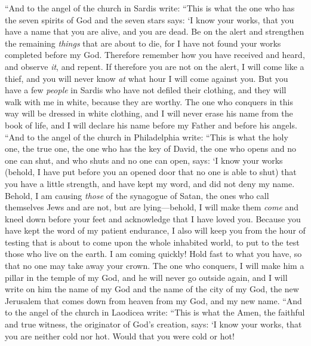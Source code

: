 \begin{biblechapter} %
 “And to the angel of the church in Sardis write:
\verse “This is what the one who has the seven spirits of God and the seven stars says: ‘I know your works, that you have a name that you are alive, and you are dead.
\verse Be on the alert and strengthen the remaining \textit{things} that are about to die, for I have not found your works completed before my God.
\verse Therefore remember how you have received and heard, and observe \textit{it}, and repent. If therefore you are not on the alert, I will come like a thief, and you will never know \textit{at} what hour I will come against you.
\verse But you have a few \textit{people} in Sardis who have not defiled their clothing, and they will walk with me in white, because they are worthy.
\verse The one who conquers in this way will be dressed in white clothing, and I will never erase his name from the book of life, and I will declare his name before my Father and before his angels.
 “And to the angel of the church in Philadelphia write:
\verse “This is what the holy one, the true one, the one who has the key of David, the one who opens and no one can shut, and who shuts and no one can open, says:
\verse ‘I know your works (behold, I have put before you an opened door that no one is able to shut) that you have a little strength, and have kept my word, and did not deny my name.
\verse Behold, I am causing \textit{those} of the synagogue of Satan, the ones who call themselves Jews and are not, but are lying—behold, I will make them \textit{come} and kneel down before your feet and acknowledge that I have loved you.
\verse Because you have kept the word of my patient endurance, I also will keep you from the hour of testing that is about to come upon the whole inhabited world, to put to the test those who live on the earth.
\verse I am coming quickly! Hold fast to what you have, so that no one may take away your crown.
\verse The one who conquers, I will make him a pillar in the temple of my God, and he will never go outside again, and I will write on him the name of my God and the name of the city of my God, the new Jerusalem that comes down from heaven from my God, and my new name.
 “And to the angel of the church in Laodicea write:
\verse “This is what the Amen, the faithful and true witness, the originator of God’s creation, says:
\verse ‘I know your works, that you are neither cold nor hot. Would that you were cold or hot!

\end{biblechapter}
